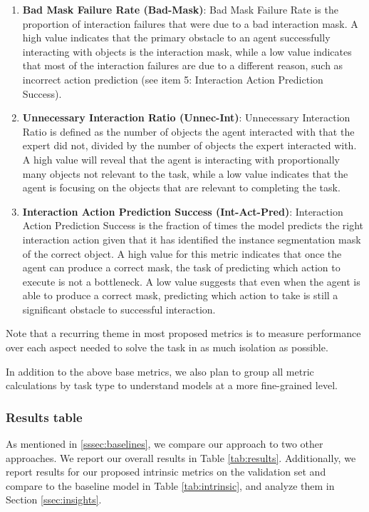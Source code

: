 \documentclass[11pt,a4paper]{article}
\begin{document}
\begin{enumerate}
    \item \textbf{Bad Mask Failure Rate (Bad-Mask)}: Bad Mask Failure Rate is the proportion of interaction failures that were due to a bad interaction mask. A high value indicates that the primary obstacle to an agent successfully interacting with objects is the interaction mask, while a low value indicates that most of the interaction failures are due to a different reason, such as incorrect action prediction (see item 5: Interaction Action Prediction Success).

    \item \textbf{Unnecessary Interaction Ratio (Unnec-Int)}: Unnecessary Interaction Ratio is defined as the number of  objects the agent interacted with that the expert did not, divided by the number of objects the expert interacted with. A high value will reveal that the agent is interacting with proportionally many objects not relevant to the task, while a low value indicates that the agent is focusing on the objects that are relevant to completing the task.
    
    \item \textbf{Interaction Action Prediction Success (Int-Act-Pred)}: Interaction Action Prediction Success is the fraction of times the model predicts the right interaction action given that it has identified the instance segmentation mask of the correct object. A high value for this metric indicates that once the agent can produce a correct mask, the task of predicting which action to execute is not a bottleneck. A low value suggests that even when the agent is able to produce a correct mask, predicting which action to take is still a significant obstacle to successful interaction.
\end{enumerate}

Note that a recurring theme in most proposed metrics is to measure performance over each aspect needed to solve the task in as much isolation as possible. %

In addition to the above base metrics, we also plan to group all metric calculations by task type to understand models at a more fine-grained level.

\subsubsection{Results table}
As mentioned in \ref{sssec:baselines}, we compare our approach to two other approaches. We report our overall results in Table \ref{tab:results}. Additionally, we report results for our proposed intrinsic metrics on the validation set and compare to the baseline model in Table \ref{tab:intrinsic}, and analyze them in Section \ref{ssec:insights}.
\end{document}
